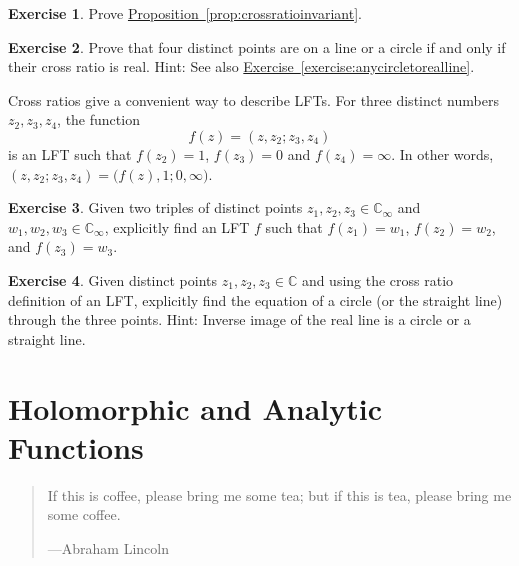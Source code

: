 \documentclass[12pt,openany]{book}
\newcommand{\C}{{\mathbb{C}}}
\theoremstyle{plain}
\theoremstyle{remark}
\theoremstyle{definition}
\newenvironment{exbox}{%
    \def\FrameCommand{\vrule width 1pt \relax\hspace{10pt}}%
    \MakeFramed{\advance\hsize-\width\FrameRestore}%
}{%
    \endMakeFramed
}
\newenvironment{myepigraph}{%
    \begin{quote}%
    \begingroup\itshape
}{%
    \endgroup%
    \end{quote}
}
\theoremstyle{exercise}
\newtheorem{exercise}{Exercise}[section]
\theoremstyle{example}
\newcommand{\exerciseref}[1]{\hyperref[#1]{Exercise~\ref*{#1}}}
\newcommand{\propref}[1]{\hyperref[#1]{Proposition~\ref*{#1}}}
\begin{document}
\begin{exbox}
\begin{exercise}
Prove \propref{prop:crossratioinvariant}.
\end{exercise}

\begin{exercise}
Prove that four distinct points are on a line or a circle if and only if
their cross ratio is real.
Hint: See also \exerciseref{exercise:anycircletorealline}.
\end{exercise}
\end{exbox}

Cross ratios give a convenient way to describe LFTs.
For three distinct numbers $z_2,z_3,z_4$, the
function
\begin{equation*}
f(z) =
(z,z_2;z_3,z_4)
\end{equation*}
is an LFT such that $f(z_2) = 1$, $f(z_3)=0$ and $f(z_4) = \infty$.
In other words,
$(z,z_2;z_3,z_4) = 
\bigl(f(z),1;0,\infty\bigr)$.

\begin{exbox}
\begin{exercise}
Given two triples of distinct points $z_1,z_2,z_3 \in \C_\infty$
and $w_1,w_2,w_3 \in \C_\infty$, explicitly find an LFT $f$
such that
$f(z_1) = w_1$,
$f(z_2) = w_2$, and
$f(z_3) = w_3$.
\end{exercise}

\begin{exercise}
Given distinct points $z_1,z_2,z_3 \in \C$ and
using the cross ratio definition of an LFT\@, explicitly find
the equation of a circle (or the straight line) through the three points.
Hint: Inverse image of the real line is a circle or a straight line.
\end{exercise}
\end{exbox}



\chapter{Holomorphic and Analytic Functions} \label{ch:holanal}

\begin{myepigraph}
If this is coffee, please bring me some tea; but if this is tea, please bring me some coffee.

---Abraham Lincoln
\end{myepigraph}
\end{document}
